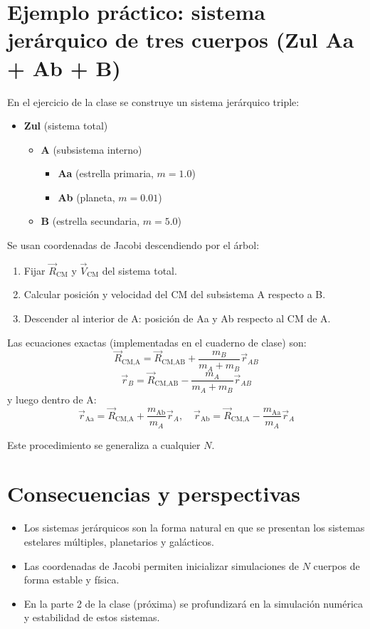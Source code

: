 \documentclass[12pt,oneside]{book}
\begin{document}
\section{Ejemplo práctico: sistema jerárquico de tres cuerpos (Zul Aa + Ab + B)}
En el ejercicio de la clase se construye un sistema jerárquico triple:

\begin{itemize}[leftmargin=2em,label={}]
\item \textbf{Zul} (sistema total)
  \begin{itemize}[leftmargin=2em,label={}]
  \item \textbf{A} (subsistema interno)
    \begin{itemize}[leftmargin=2em,label={}]
    \item \textbf{Aa} (estrella primaria, \(m = 1.0\))
    \item \textbf{Ab} (planeta, \(m = 0.01\))
    \end{itemize}
  \item \textbf{B} (estrella secundaria, \(m = 5.0\))
  \end{itemize}
\end{itemize}

Se usan coordenadas de Jacobi descendiendo por el árbol:
\begin{enumerate}
    \item Fijar \(\vec{R}_{\text{CM}}\) y \(\vec{V}_{\text{CM}}\) del sistema total.
    \item Calcular posición y velocidad del CM del subsistema A respecto a B.
    \item Descender al interior de A: posición de Aa y Ab respecto al CM de A.
\end{enumerate}

Las ecuaciones exactas (implementadas en el cuaderno de clase) son:
\[
\vec{R}_{\text{CM,A}} = \vec{R}_{\text{CM,AB}} + \frac{m_B}{m_A + m_B} \vec{r}_{AB}
\]
\[
\vec{r}_B = \vec{R}_{\text{CM,AB}} - \frac{m_A}{m_A + m_B} \vec{r}_{AB}
\]
y luego dentro de A:
\[
\vec{r}_{\text{Aa}} = \vec{R}_{\text{CM,A}} + \frac{m_{\text{Ab}}}{m_A} \vec{r}_A, \quad
\vec{r}_{\text{Ab}} = \vec{R}_{\text{CM,A}} - \frac{m_{\text{Aa}}}{m_A} \vec{r}_A
\]

Este procedimiento se generaliza a cualquier \(N\).

\section{Consecuencias y perspectivas}
\begin{itemize}
    \item Los sistemas jerárquicos son la forma natural en que se presentan los sistemas estelares múltiples, planetarios y galácticos.
    \item Las coordenadas de Jacobi permiten inicializar simulaciones de \(N\) cuerpos de forma estable y física.
    \item En la parte 2 de la clase (próxima) se profundizará en la simulación numérica y estabilidad de estos sistemas.
\end{itemize}
\end{document}

